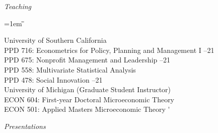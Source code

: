 \documentclass[12pt]{article}
\newlength{\midlength}
\newlength{\firstlength}
\newlength{\listindent}
\newlength{\dategap}
\newlength{\wrapgap}
\newcommand{\heading}[1]{
	{\setlength{\parskip}{0.8cm plus6mm minus3mm}
	\parindent=0pt
	\large \textit{{#1}}}
	\vspace{0.1em}
}
\newenvironment{datetabbing}{
	\begin{tabbing}
	\parskip=1em
	\hspace*{\listindent}\=\hspace*{\firstlength}\=\hspace*{\midlength}\= \kill
}{
	\end{tabbing}
}
\begin{document}


\heading{Teaching}

\begin{datetabbing}
\>	University of Southern California													\\[\wrapgap]
\>	\>	PPD 716: Econometrics for Policy, Planning and Management I %
																--21	\'	\\[\wrapgap]
\>	\>	PPD 675: Nonprofit Management and Leadership				--21	\'	\\[\wrapgap]
\>	\>	PPD 558: Multivariate Statistical Analysis						\'	\\[\wrapgap]
\>	\>	PPD 478: Social Innovation %
																--21	\'	\\[\dategap]

\>	University of Michigan (Graduate Student Instructor)								\\
\>	\>	ECON 604: First-year Doctoral Microeconomic Theory				\'	\\[\wrapgap]
\>	\>	ECON 501: Applied Masters Microeconomic Theory					\'	%
\end{datetabbing}



\clearpage
\heading{Presentations}
\end{document}
